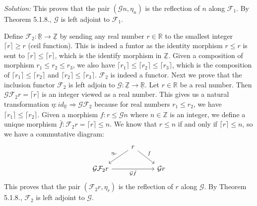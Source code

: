 \documentclass[a4paper, 12pt]{article}
\newenvironment{solution}
    {\textit{Solution:}}
    {}
\begin{document}
\begin{solution}
This proves that the pair \((\mathcal{G}n,\eta_n)\) is the reflection of \(n\) along \(\mathcal{F}_1\). By Theorem 5.1.8., \(\mathcal{G}\) is left adjoint to \(\mathcal{F}_1\). 
\par 
Define \(\mathcal{F}_2:\underline{\mathbb{R}}\rightarrow \underline{\mathbb{Z}}\) by sending any real number \(r\in \mathbb{R}\) to the smallest integer \(\lceil  r \rceil\geq r\) (ceil function). This is indeed a funtor as the identity morphism \(r\leq r\) 
is sent to \(\lceil r\rceil \leq \lceil r\rceil\), which is the identify morphism in \(\underline{\mathbb{Z}}\). Given a composition of morphism \(r_1\leq r_2\leq r_3\), we also have \(\lceil r_1\rceil \leq \lceil r_2\rceil \leq \lceil r_3\rceil\), which is the composition of 
\(\lceil r_1\rceil \leq \lceil r_2\rceil\) and \(\lceil r_2\rceil\leq \lceil r_3\rceil\). \(\mathcal{F}_2\) is indeed a functor. Next we prove that the inclusion functor \(\mathcal{F}_2\) is left adjoin to \(\mathcal{G}:\underline{\mathbb{Z}}\rightarrow \underline{\mathbb{R}}\). 
Let \(r\in \mathbb{R}\) be a real number. Then \(\mathcal{G}\mathcal{F}_2r=\lceil r\rceil\) is an integer viewed as a real number. This gives us a natural transformation \(\eta:id_{\underline{\mathbb{R}}}\Rightarrow \mathcal{G}\mathcal{F}_2\) because for real numbers \(r_1\leq r_2\), we have \(\lceil r_1\rceil\leq \lceil r_2\rceil\). 
Given a morphism \(f:r\leq \mathcal{G}n\) where \(n\in \mathbb{Z}\) is an integer, we define a unique morphism \(\bar{f}:\mathcal{F}_2r=\lceil r\rceil\leq n \). We know that \(r\leq n\) if and only if \(\lceil r\rceil \leq n\), so we have a commutative diagram:
\[\begin{tikzcd}
	& r \\
	{\mathcal{G}\mathcal{F}_2r} && {\mathcal{G}r}
	\arrow["{\eta_r}"', from=1-2, to=2-1]
	\arrow["f", from=1-2, to=2-3]
	\arrow["{\mathcal{G}\bar{f}}"', from=2-1, to=2-3]
\end{tikzcd}\]
This proves that the pair \((\mathcal{F}_2r,\eta_r)\) is the reflection of \(r\) along \(\mathcal{G}\). By Theorem 5.1.8., \(\mathcal{F}_2\) is left adjoint to \(\mathcal{G}\). 

\end{solution}
\end{document}
